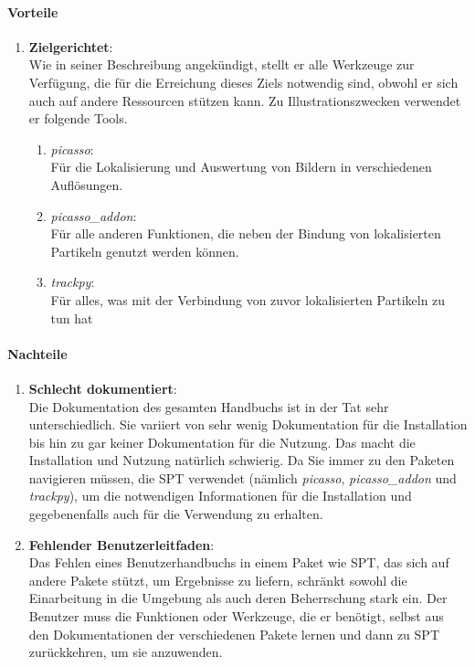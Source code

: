 	\paragraph{Vorteile}
		\begin{enumerate}
    			\item \textbf{Zielgerichtet}:\\
				Wie in seiner Beschreibung angekündigt, stellt er alle Werkzeuge zur Verfügung, die für die Erreichung dieses Ziels notwendig sind, obwohl er sich auch auf andere Ressourcen stützen kann. Zu Illustrationszwecken verwendet er folgende Tools.
				
				\begin{enumerate}
					\item \textit{picasso}:\\
				 		Für die Lokalisierung und Auswertung von Bildern in verschiedenen Auflösungen.
					\item \textit{picasso\_addon}:\\
						Für alle anderen Funktionen, die neben der Bindung von lokalisierten Partikeln genutzt werden 								können.
					\item \textit{trackpy}:\\
						Für alles, was mit der Verbindung von zuvor lokalisierten Partikeln zu tun hat
				\end{enumerate}
    			
		\end{enumerate}
		
	\paragraph{Nachteile}
		\begin{enumerate}
    			\item \textbf{Schlecht dokumentiert}:\\
				Die Dokumentation des gesamten Handbuchs ist in der Tat sehr unterschiedlich. Sie variiert von sehr wenig Dokumentation für die Installation bis hin zu gar keiner Dokumentation für die Nutzung.  Das macht die Installation und Nutzung natürlich schwierig. Da Sie immer zu den Paketen navigieren müssen, die SPT verwendet (nämlich \textit{picasso}, \textit{picasso\_addon} und \textit{trackpy}), um die notwendigen Informationen für die Installation und gegebenenfalls auch für die Verwendung zu erhalten.
				
    			\item \textbf{Fehlender Benutzerleitfaden}:\\
				Das Fehlen eines Benutzerhandbuchs in einem Paket wie SPT, das sich auf andere Pakete stützt, um Ergebnisse zu liefern, schränkt sowohl die Einarbeitung in die Umgebung als auch deren Beherrschung stark ein. Der Benutzer muss die Funktionen oder Werkzeuge, die er benötigt, selbst aus den Dokumentationen der verschiedenen Pakete lernen und dann zu SPT zurückkehren, um sie anzuwenden.
				
    			
		\end{enumerate}



